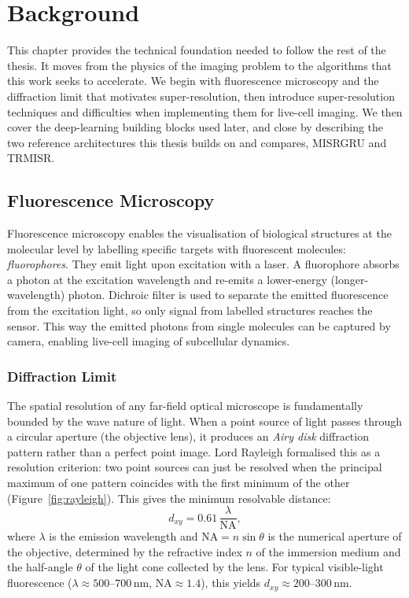 \chapter{Background}
\label{ch:background}

This chapter provides the technical foundation needed to follow the rest of the thesis.
It moves from the physics of the imaging problem to the algorithms that this work seeks to
accelerate. We begin with fluorescence microscopy and the diffraction limit that motivates
super-resolution, then introduce super-resolution techniques and difficulties when implementing 
them for live-cell imaging.
We then cover the deep-learning building blocks used later, and close by describing the two
reference architectures this thesis builds on and compares, MISRGRU and TRMISR.

\section{Fluorescence Microscopy}
\label{sec:fluorescence}

Fluorescence microscopy enables the visualisation of biological structures at the 
molecular level by labelling specific targets with fluorescent molecules: \emph{fluorophores}.
They emit light upon excitation with a laser. 
A fluorophore absorbs a photon at the excitation wavelength and re-emits a 
lower-energy (longer-wavelength) photon. 
Dichroic filter is used to separate the emitted fluorescence from the excitation light, 
so only signal from labelled structures reaches the sensor. 
This way the emitted photons from single molecules can be captured by camera,
enabling live-cell imaging of subcellular dynamics.

\subsection{Diffraction Limit}
\label{subsec:diffraction}



The spatial resolution of any far-field optical microscope is fundamentally bounded 
by the wave nature of light. 
When a point source of light passes through a circular aperture (the objective lens), 
it produces an \emph{Airy disk} diffraction pattern rather than a perfect point image. 
Lord Rayleigh formalised this as a resolution criterion: two point sources can just be resolved when the
principal maximum of one pattern coincides with the first minimum of the other~\cite{born1999principles}
(Figure~\ref{fig:rayleigh}).
This gives the minimum resolvable distance:
\begin{equation}
    d_{xy} = 0.61\,\frac{\lambda}{\mathrm{NA}},
    \label{eq:rayleigh}
\end{equation}
where $\lambda$ is the emission wavelength and $\mathrm{NA} = n\sin\theta$ is the 
numerical aperture of the objective, determined by the refractive index $n$ of the 
immersion medium and the half-angle $\theta$ of the light cone collected by the lens. 
For typical visible-light fluorescence ($\lambda \approx 500$--$700\,\mathrm{nm}$, $\mathrm{NA} \approx 1.4$), this yields $d_{xy} \approx 200$--$300\,\mathrm{nm}$.

